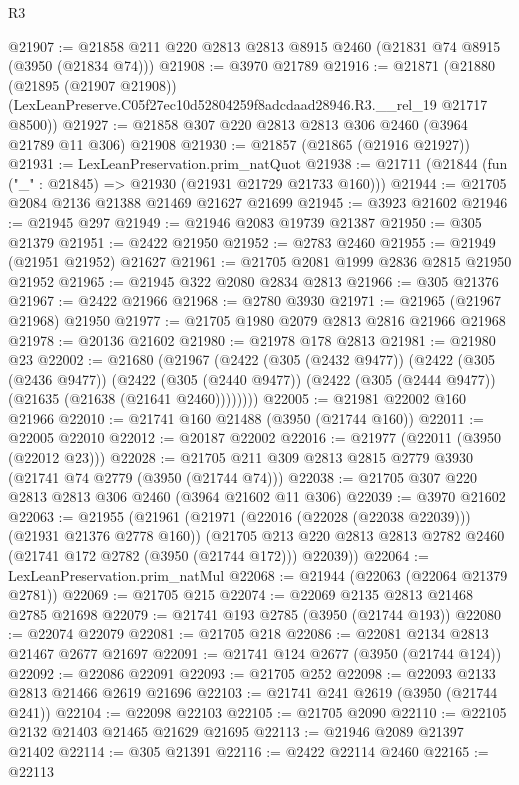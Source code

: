 \begin{lexlean}{R3}
\begin{coremodule}
@21907 := @21858 @211 @220 @2813 @2813 @8915 @2460 (@21831 @74 @8915 (@3950 (@21834 @74)))
@21908 := @3970 @21789
@21916 := @21871
    (@21880
      (@21895 (@21907 @21908))
      (LexLeanPreserve.C05f27ec10d52804259f8adcdaad28946.R3.__rel_19 @21717 @8500))
@21927 := @21858 @307 @220 @2813 @2813 @306 @2460 (@3964 @21789 @11 @306) @21908
@21930 := @21857 (@21865 (@21916 @21927))
@21931 := LexLeanPreservation.prim_natQuot
@21938 := @21711 (@21844 (fun ("_" : @21845) => @21930 (@21931 @21729 @21733 @160)))
@21944 := @21705 @2084 @2136 @21388 @21469 @21627 @21699
@21945 := @3923 @21602
@21946 := @21945 @297
@21949 := @21946 @2083 @19739 @21387
@21950 := @305 @21379
@21951 := @2422 @21950
@21952 := @2783 @2460
@21955 := @21949 (@21951 @21952) @21627
@21961 := @21705 @2081 @1999 @2836 @2815 @21950 @21952
@21965 := @21945 @322 @2080 @2834 @2813
@21966 := @305 @21376
@21967 := @2422 @21966
@21968 := @2780 @3930
@21971 := @21965 (@21967 @21968) @21950
@21977 := @21705 @1980 @2079 @2813 @2816 @21966 @21968
@21978 := @20136 @21602
@21980 := @21978 @178 @2813
@21981 := @21980 @23
@22002 := @21680
    (@21967
      (@2422
        (@305 (@2432 @9477))
        (@2422
          (@305 (@2436 @9477))
          (@2422
            (@305 (@2440 @9477))
            (@2422 (@305 (@2444 @9477)) (@21635 (@21638 (@21641 @2460))))))))
@22005 := @21981 @22002 @160 @21966
@22010 := @21741 @160 @21488 (@3950 (@21744 @160))
@22011 := @22005 @22010
@22012 := @20187 @22002
@22016 := @21977 (@22011 (@3950 (@22012 @23)))
@22028 := @21705 @211 @309 @2813 @2815 @2779 @3930 (@21741 @74 @2779 (@3950 (@21744 @74)))
@22038 := @21705 @307 @220 @2813 @2813 @306 @2460 (@3964 @21602 @11 @306)
@22039 := @3970 @21602
@22063 := @21955
    (@21961
      (@21971 (@22016 (@22028 (@22038 @22039))) (@21931 @21376 @2778 @160))
      (@21705 @213 @220 @2813 @2813 @2782 @2460 (@21741 @172 @2782 (@3950 (@21744 @172))) @22039))
@22064 := LexLeanPreservation.prim_natMul
@22068 := @21944 (@22063 (@22064 @21379 @2781))
@22069 := @21705 @215
@22074 := @22069 @2135 @2813 @21468 @2785 @21698
@22079 := @21741 @193 @2785 (@3950 (@21744 @193))
@22080 := @22074 @22079
@22081 := @21705 @218
@22086 := @22081 @2134 @2813 @21467 @2677 @21697
@22091 := @21741 @124 @2677 (@3950 (@21744 @124))
@22092 := @22086 @22091
@22093 := @21705 @252
@22098 := @22093 @2133 @2813 @21466 @2619 @21696
@22103 := @21741 @241 @2619 (@3950 (@21744 @241))
@22104 := @22098 @22103
@22105 := @21705 @2090
@22110 := @22105 @2132 @21403 @21465 @21629 @21695
@22113 := @21946 @2089 @21397 @21402
@22114 := @305 @21391
@22116 := @2422 @22114 @2460
@22165 := @22113

\end{coremodule}
\end{lexlean}
